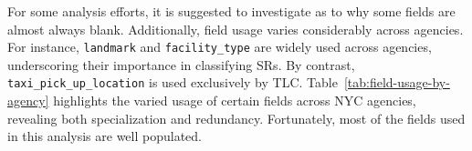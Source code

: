 \documentclass[linenumber]{jdsart}
\begin{document}
For some analysis efforts, it is suggested to investigate as to 
why some fields are almost always blank. Additionally, 
field usage varies considerably across agencies. For instance,
\texttt{landmark} and \texttt{facility\_type} are widely used across agencies,
underscoring their importance in classifying SRs. By contrast,
\texttt{taxi\_pick\_up\_location} is used exclusively by TLC. 
Table~\ref{tab:field-usage-by-agency} highlights the varied usage of
certain fields across NYC agencies, revealing both specialization and
redundancy. Fortunately, most of the fields used in 
this analysis are well populated.

\begin{table}[tbp]
\centering
\caption{Sample field usage containing non-null values by select agencies  (2020--2024)}
\label{tab:field-usage-by-agency}
\small
{}
\end{table}
\end{document}
